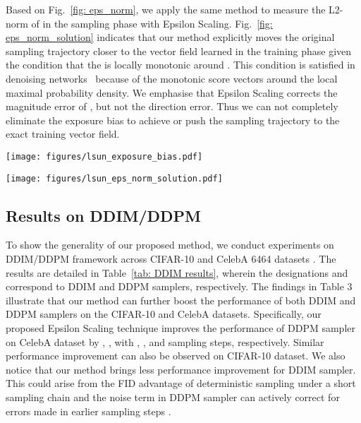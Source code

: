 \documentclass{article} \usepackage{iclr2024_conference,times}
\begin{document}
Based on Fig.~\ref{fig: eps_norm}, we apply the same method to measure the L2-norm of  in the sampling phase with Epsilon Scaling. Fig.~\ref{fig: eps_norm_solution} indicates that our method explicitly moves the original sampling trajectory closer to the vector field learned in the training phase given the condition that the  is locally monotonic around . This condition is satisfied in denoising networks~\citep{DeepLearning,song2019generative} because of the monotonic score vectors around the local maximal probability density. We emphasise that Epsilon Scaling corrects the magnitude error of , but not the direction error. Thus we can not completely eliminate the exposure bias to achieve  or push the sampling trajectory to the exact training vector field. 






\begin{figure*}[ht]
\vskip -0.1in
\scriptsize
  \begin{minipage}{0.46\linewidth}
    \begin{center}
    \centerline{\texttt{[image: figures/lsun\_exposure\_bias.pdf]}}
    \caption{Exposure bias measured by  on LSUN 6464. Epsilon Scaling achieves a smaller  at the end of sampling ()
    }
    \label{fig: xt_var_error}
    \end{center}
  \end{minipage}\hfill
  \begin{minipage}{0.52\linewidth}
    \begin{center}
    \centerline{\texttt{[image: figures/lsun\_eps\_norm\_solution.pdf]}}
    \caption{ on LSUN 6464. After applying Epsilon Scaling, the sampling  (blue) gets closer to the training  (red).
    }
    \label{fig: eps_norm_solution}
    \end{center}
  \end{minipage}
\vskip -0.2in
\end{figure*}



\subsection{Results on DDIM/DDPM}
To show the generality of our proposed method, we conduct experiments on DDIM/DDPM framework across CIFAR-10 and CelebA 6464 datasets \citep{liu2015faceattributes}. The results are detailed in Table~\ref{tab: DDIM results}, wherein the designations  and  correspond to DDIM and DDPM samplers, respectively. The findings in Table 3 illustrate that our method can further boost the performance of both DDIM and DDPM samplers on the CIFAR-10 and CelebA datasets. Specifically, our proposed Epsilon Scaling technique improves the performance of DDPM sampler on CelebA dataset by , ,  with , , and  sampling steps, respectively. Similar performance improvement can also be observed on CIFAR-10 dataset. We also notice that our method brings less performance improvement for DDIM sampler. This could arise from the FID advantage of deterministic sampling under a short sampling chain and the noise term in DDPM sampler can actively correct for errors made in earlier sampling steps \citet{karras2022elucidating}.
\end{document}

